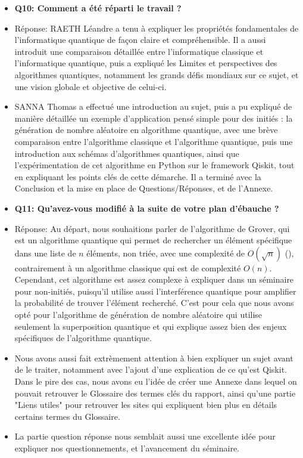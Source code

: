 \documentclass{article}
\begin{document}
\begin{itemize}
\\
  \item \textbf{Q10: Comment a été réparti le travail ?}
  \item Réponse: RAETH Léandre a tenu à expliquer les propriétés fondamentales de l'informatique quantique de façon claire et compréhensible. Il a aussi introduit une comparaison détaillée entre l'informatique classique et l'informatique quantique, puis a expliqué les Limites et perspectives des algorithmes quantiques, notamment les grands défis mondiaux sur ce sujet, et une vision globale et objective de celui-ci.
  \item SANNA Thomas a effectué une introduction au sujet, puis a pu expliqué de manière détaillée un exemple d'application pensé simple pour des initiés : la génération de nombre aléatoire en algorithme quantique, avec une brève comparaison entre l'algorithme classique et l'algorithme quantique, puis une introduction aux schémas d'algorithmes quantiques, ainsi que l'expérimentation de cet algorithme en Python sur le framework Qiskit, tout en expliquant les points clés de cette démarche. Il a terminé avec la Conclusion et la mise en place de Questions/Réponses, et de l'Annexe.
\\
  \item \textbf{Q11: Qu'avez-vous modifié à la suite de votre plan d'ébauche ?}
  \item Réponse: Au départ, nous souhaitions parler de l'algorithme de Grover, qui est un algorithme quantique qui permet de rechercher un élément spécifique dans une liste de $n$ éléments, non triée, avec une complexité de $O(\sqrt{n})$ (\cite{wikipediaAlgorithmeGrover}), contrairement à un algorithme classique qui est de complexité $O(n)$. Cependant, cet algorithme est assez complexe à expliquer dans un séminaire pour non-initiés, puisqu'il utilise aussi l'interférence quantique pour amplifier la probabilité de trouver l'élément recherché. C'est pour cela que nous avons opté pour l'algorithme de génération de nombre aléatoire qui utilise seulement la superposition quantique et qui explique assez bien des enjeux spécifiques de l'algorithme quantique.
  \item Nous avons aussi fait extrèmement attention à bien expliquer un sujet avant de le traiter, notamment avec l'ajout d'une explication de ce qu'est Qiskit. Dans le pire des cas, nous avons eu l'idée de créer une Annexe dans lequel on pouvait retrouver le Glossaire des termes clés du rapport, ainsi qu'une partie "Liens utiles" pour retrouver les sites qui expliquent bien plus en détails certains termes du Glossaire.
  \item La partie question réponse nous semblait aussi une excellente idée pour expliquer nos questionnements, et l'avancement du séminaire.

\end{itemize}
\end{document}
